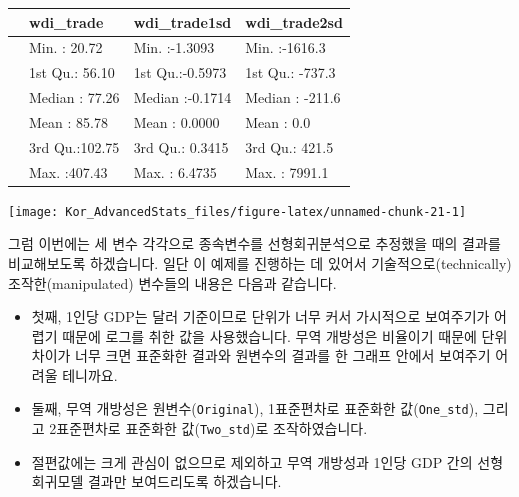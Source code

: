 \documentclass[
]{book}
\newenvironment{Shaded}{\begin{snugshade}}{\end{snugshade}}
\newcommand{\DataTypeTok}[1]{\textcolor[rgb]{0.13,0.29,0.53}{#1}}
\newcommand{\DecValTok}[1]{\textcolor[rgb]{0.00,0.00,0.81}{#1}}
\newcommand{\KeywordTok}[1]{\textcolor[rgb]{0.13,0.29,0.53}{\textbf{#1}}}
\newcommand{\NormalTok}[1]{#1}
\newcommand{\OperatorTok}[1]{\textcolor[rgb]{0.81,0.36,0.00}{\textbf{#1}}}
\newcommand{\StringTok}[1]{\textcolor[rgb]{0.31,0.60,0.02}{#1}}
\begin{document}
\begin{Shaded}
\end{Shaded}

\begin{tabular}{l|l|l|l}
\hline
  &   wdi\_trade &  wdi\_trade1sd &  wdi\_trade2sd\\
\hline
 & Min.   : 20.72 & Min.   :-1.3093 & Min.   :-1616.3\\
\hline
 & 1st Qu.: 56.10 & 1st Qu.:-0.5973 & 1st Qu.: -737.3\\
\hline
 & Median : 77.26 & Median :-0.1714 & Median : -211.6\\
\hline
 & Mean   : 85.78 & Mean   : 0.0000 & Mean   :    0.0\\
\hline
 & 3rd Qu.:102.75 & 3rd Qu.: 0.3415 & 3rd Qu.:  421.5\\
\hline
 & Max.   :407.43 & Max.   : 6.4735 & Max.   : 7991.1\\
\hline
\end{tabular}

\begin{center}\texttt{[image: Kor\_AdvancedStats\_files/figure-latex/unnamed-chunk-21-1]} \end{center}

그럼 이번에는 세 변수 각각으로 종속변수를 선형회귀분석으로 추정했을 때의 결과를 비교해보도록 하겠습니다. 일단 이 예제를 진행하는 데 있어서 기술적으로(technically) 조작한(manipulated) 변수들의 내용은 다음과 같습니다.

\begin{itemize}
\item
  첫째, 1인당 GDP는 달러 기준이므로 단위가 너무 커서 가시적으로 보여주기가 어렵기 때문에 로그를 취한 값을 사용했습니다. 무역 개방성은 비율이기 때문에 단위차이가 너무 크면 표준화한 결과와 원변수의 결과를 한 그래프 안에서 보여주기 어려울 테니까요.
\item
  둘째, 무역 개방성은 원변수(\texttt{Original}), 1표준편차로 표준화한 값(\texttt{One\_std}), 그리고 2표준편차로 표준화한 값(\texttt{Two\_std})로 조작하였습니다.
\item
  절편값에는 크게 관심이 없으므로 제외하고 무역 개방성과 1인당 GDP 간의 선형회귀모델 결과만 보여드리도록 하겠습니다.
\end{itemize}
\end{document}
